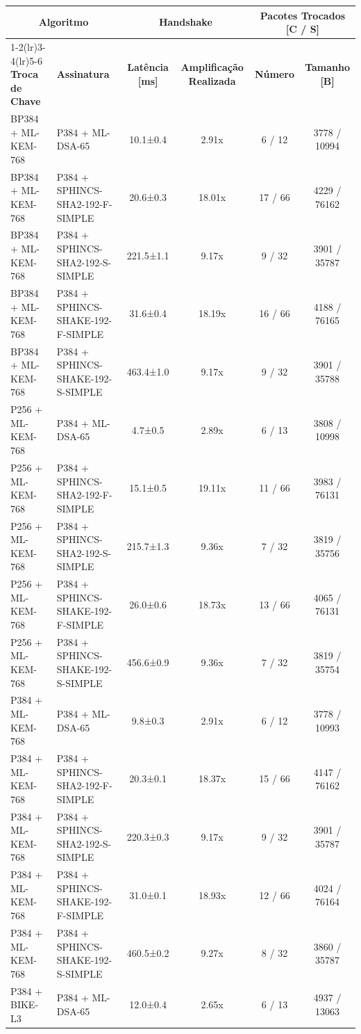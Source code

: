 \documentclass[10pt]{article}
\begin{document}
\centering
\small
\begin{tabular}{@{}l l c c c c@{}}
\toprule
\multicolumn{2}{c}{\textbf{Algoritmo}} & \multicolumn{2}{c}{\textbf{Handshake}} & \multicolumn{2}{c}{\textbf{Pacotes Trocados [C / S]}} \\
\cmidrule(lr){1-2}\cmidrule(lr){3-4}\cmidrule(lr){5-6}
\textbf{Troca de Chave} & \textbf{Assinatura} & \textbf{Latência [ms]} & \textbf{Amplificação Realizada} & \textbf{Número} & \textbf{Tamanho [B]} \\
\midrule
BP384 + ML-KEM-768 & P384 + ML-DSA-65 & 10.1±0.4 & 2.91x & 6 / 12 & 3778 / 10994 \\
BP384 + ML-KEM-768 & P384 + SPHINCS-SHA2-192-F-SIMPLE & 20.6±0.3 & 18.01x & 17 / 66 & 4229 / 76162 \\
BP384 + ML-KEM-768 & P384 + SPHINCS-SHA2-192-S-SIMPLE & 221.5±1.1 & 9.17x & 9 / 32 & 3901 / 35787 \\
BP384 + ML-KEM-768 & P384 + SPHINCS-SHAKE-192-F-SIMPLE & 31.6±0.4 & 18.19x & 16 / 66 & 4188 / 76165 \\
BP384 + ML-KEM-768 & P384 + SPHINCS-SHAKE-192-S-SIMPLE & 463.4±1.0 & 9.17x & 9 / 32 & 3901 / 35788 \\
P256 + ML-KEM-768 & P384 + ML-DSA-65 & 4.7±0.5 & 2.89x & 6 / 13 & 3808 / 10998 \\
P256 + ML-KEM-768 & P384 + SPHINCS-SHA2-192-F-SIMPLE & 15.1±0.5 & 19.11x & 11 / 66 & 3983 / 76131 \\
P256 + ML-KEM-768 & P384 + SPHINCS-SHA2-192-S-SIMPLE & 215.7±1.3 & 9.36x & 7 / 32 & 3819 / 35756 \\
P256 + ML-KEM-768 & P384 + SPHINCS-SHAKE-192-F-SIMPLE & 26.0±0.6 & 18.73x & 13 / 66 & 4065 / 76131 \\
P256 + ML-KEM-768 & P384 + SPHINCS-SHAKE-192-S-SIMPLE & 456.6±0.9 & 9.36x & 7 / 32 & 3819 / 35754 \\
P384 + ML-KEM-768 & P384 + ML-DSA-65 & 9.8±0.3 & 2.91x & 6 / 12 & 3778 / 10993 \\
P384 + ML-KEM-768 & P384 + SPHINCS-SHA2-192-F-SIMPLE & 20.3±0.1 & 18.37x & 15 / 66 & 4147 / 76162 \\
P384 + ML-KEM-768 & P384 + SPHINCS-SHA2-192-S-SIMPLE & 220.3±0.3 & 9.17x & 9 / 32 & 3901 / 35787 \\
P384 + ML-KEM-768 & P384 + SPHINCS-SHAKE-192-F-SIMPLE & 31.0±0.1 & 18.93x & 12 / 66 & 4024 / 76164 \\
P384 + ML-KEM-768 & P384 + SPHINCS-SHAKE-192-S-SIMPLE & 460.5±0.2 & 9.27x & 8 / 32 & 3860 / 35787 \\
P384 + BIKE-L3 & P384 + ML-DSA-65 & 12.0±0.4 & 2.65x & 6 / 13 & 4937 / 13063 \\

\end{tabular}
\end{document}
